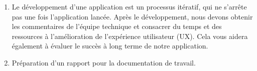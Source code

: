 \begin{enumerate}
	
	\item Le développement d'une application est un processus itératif, qui ne s'arrête pas une fois l'application lancée. Après le développement, nous devons obtenir les commentaires de l'équipe technique et consacrer du temps et des ressources à l'amélioration de l'expérience utilisateur (UX). Cela vous aidera également à évaluer le succès à long terme de notre application.
	
	\item Préparation d'un rapport pour la documentation de travail.
\end{enumerate}

